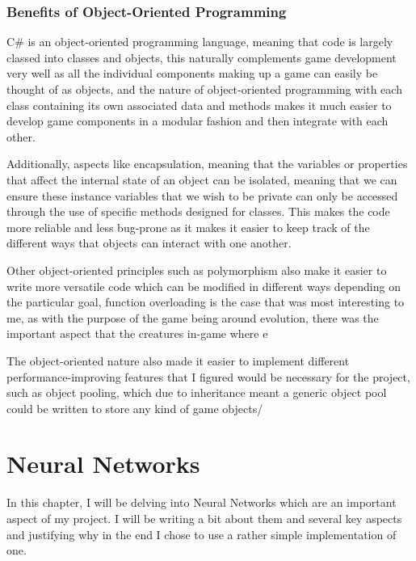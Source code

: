 \subsubsection{Benefits of Object-Oriented Programming}
C\# is an object-oriented programming language, meaning that code is largely classed into classes and objects, this naturally complements game development very well as all the individual components making up a game can easily be thought of as objects, and the nature of object-oriented programming with each class containing its own associated data and methods makes it much easier to develop game components in a modular fashion and then integrate with each other.
\par
Additionally, aspects like encapsulation, meaning that the variables or properties that affect the internal state of an object can be isolated, meaning that we can ensure these instance variables that we wish to be private can only be accessed through the use of specific methods designed for classes. This makes the code more reliable and less bug-prone as it makes it easier to keep track of the different ways that objects can interact with one another.
\par
Other object-oriented principles such as polymorphism also make it easier to write more versatile code which can be modified in different ways depending on the particular goal, function overloading is the case that was most interesting to me, as with the purpose of the game being around evolution, there was the important aspect that the creatures in-game where e
\par
The object-oriented nature also made it easier to implement different performance-improving features that I figured would be necessary for the project, such as object pooling, which due to inheritance meant a generic object pool could be written to store any kind of game objects/
\section{Neural Networks}
In this chapter, I will be delving into Neural Networks which are an important aspect of my project. I will be writing a bit about them and several key aspects and justifying why in the end I chose to use a rather simple implementation of one.
